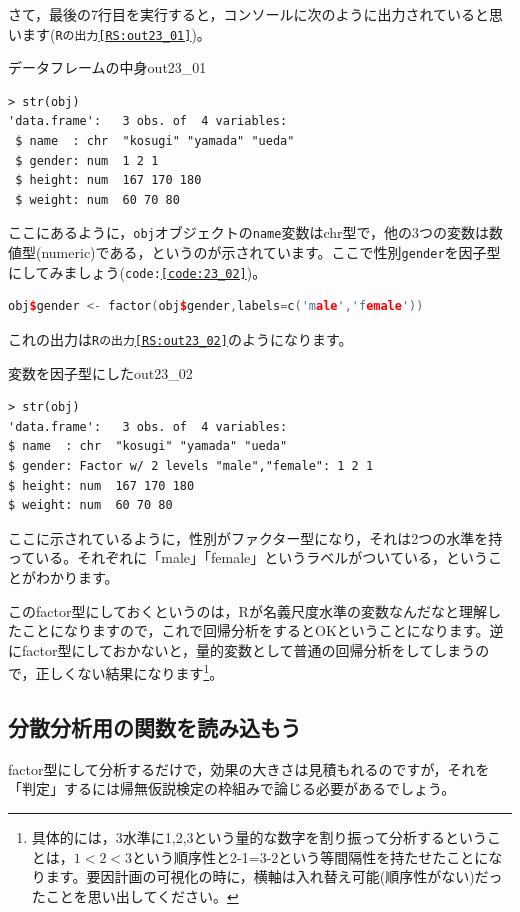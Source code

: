 \documentclass{ltjbook}
\begin{document}
さて，最後の7行目を実行すると，コンソールに次のように出力されていると思います(\texttt{Rの出力\ref{RS:out23_01}})。
\begin{Rscreen}{データフレームの中身}{out23_01}
	\begin{verbatim}
> str(obj)
'data.frame':	3 obs. of  4 variables:
 $ name  : chr  "kosugi" "yamada" "ueda"
 $ gender: num  1 2 1
 $ height: num  167 170 180
 $ weight: num  60 70 80
\end{verbatim}
\end{Rscreen}
ここにあるように，\texttt{obj}オブジェクトの\texttt{name}変数はchr型で，他の3つの変数は数値型(numeric)である，というのが示されています。ここで性別\texttt{gender}を因子型にしてみましょう(\texttt{code:\ref{code:23_02}})。

\begin{lstlisting}[language=c++,label={code:23_02},caption={因子型にする}]
obj$gender <- factor(obj$gender,labels=c('male','female'))
\end{lstlisting}

これの出力は\texttt{Rの出力\ref{RS:out23_02}}のようになります。
\begin{Rscreen}{変数を因子型にした}{out23_02}
	\begin{verbatim}
> str(obj)
'data.frame':	3 obs. of  4 variables:
$ name  : chr  "kosugi" "yamada" "ueda"
$ gender: Factor w/ 2 levels "male","female": 1 2 1
$ height: num  167 170 180
$ weight: num  60 70 80
\end{verbatim}
\end{Rscreen}
ここに示されているように，性別がファクター型になり，それは2つの水準を持っている。それぞれに「male」「female」というラベルがついている，ということがわかります。

このfactor型にしておくというのは，Rが名義尺度水準の変数なんだなと理解したことになりますので，これで回帰分析をするとOKということになります。逆にfactor型にしておかないと，量的変数として普通の回帰分析をしてしまうので，正しくない結果になります\footnote{具体的には，3水準に1,2,3という量的な数字を割り振って分析するということは，$1<2<3$という順序性と2-1=3-2という等間隔性を持たせたことになります。要因計画の可視化の時に，横軸は入れ替え可能(順序性がない)だったことを思い出してください。}。

\subsection{分散分析用の関数を読み込もう}
factor型にして分析するだけで，効果の大きさは見積もれるのですが，それを「判定」するには帰無仮説検定の枠組みで論じる必要があるでしょう。
\end{document}
